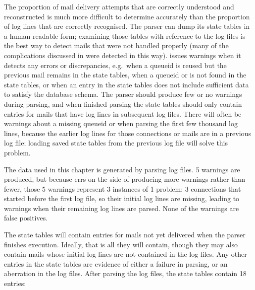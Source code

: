 The proportion of mail delivery attempts that are correctly understood and
reconstructed is much more difficult to determine accurately than the
proportion of log lines that are correctly recognised.  The parser can dump
its state tables in a human readable form; examining those tables with
reference to the log files is the best way to detect mails that were not
handled properly (many of the complications discussed in
 were detected in this way).  \parsername{}
issues warnings when it detects any errors or discrepancies, e.g.\ when a
queueid is reused but the previous mail remains in the state tables, when a
queueid or  is not found in the state tables, or when an entry
in the state tables does not include sufficient data to satisfy the
database schema.  The parser should produce few or no warnings during
parsing, and when finished parsing the state tables should only contain
entries for mails that have log lines in subsequent log files.  There will
often be warnings about a missing queueid or  when parsing the
first few thousand log lines, because the earlier log lines for those
connections or mails are in a previous log file; loading saved state tables
from the previous log file will solve this problem.

The data used in this chapter is generated by parsing \numberOFlogFILES{}
log files.  5 warnings are produced, but because \parsername{} errs on the
side of producing more warnings rather than fewer, those 5 warnings
represent 3 instances of 1 problem: 3 connections that started before the
first log file, so their initial log lines are missing, leading to warnings
when their remaining log lines are parsed.  None of the warnings are false
positives.

The state tables will contain entries for mails not yet delivered when the
parser finishes execution.  Ideally, that is all they will contain, though
they may also contain mails whose initial log lines are not contained in
the log files.  Any other entries in the state tables are evidence of
either a failure in parsing, or an aberration in the log files.  After
parsing the \numberOFlogFILES{} log files, the state tables contain 18
entries:


